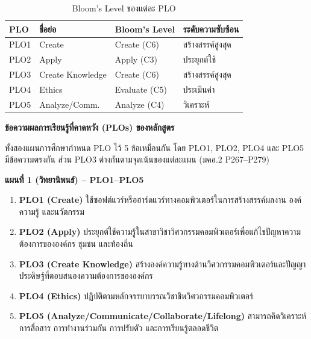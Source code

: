 \begin{table}[H]
  \centering
  \caption{Bloom's Level ของแต่ละ PLO}
  \label{tbl:bloom_plo}
  \begin{tabularx}{\linewidth}{|>{\raggedright\arraybackslash}X|>{\raggedright\arraybackslash}X|>{\raggedright\arraybackslash}X|>{\raggedright\arraybackslash}X|}
    \hline
    \textbf{PLO} & \textbf{ชื่อย่อ} & \textbf{Bloom's Level} & \textbf{ระดับความซับซ้อน} \\
    \hline
    PLO1 & Create           & Create (C6)   & สร้างสรรค์สูงสุด \\
    PLO2 & Apply            & Apply (C3)    & ประยุกต์ใช้ \\
    PLO3 & Create Knowledge & Create (C6)   & สร้างสรรค์สูงสุด \\
    PLO4 & Ethics           & Evaluate (C5) & ประเมินค่า \\
    PLO5 & Analyze/Comm.    & Analyze (C4)  & วิเคราะห์ \\
    \hline
  \end{tabularx}
\end{table}

\noindent\textbf{ข้อความผลการเรียนรู้ที่คาดหวัง (PLOs) ของหลักสูตร}

ทั้งสองแผนการศึกษากำหนด PLO ไว้ 5 ข้อเหมือนกัน โดย PLO1, PLO2, PLO4 และ PLO5 มีข้อความตรงกัน ส่วน PLO3 ต่างกันตามจุดเน้นของแต่ละแผน (มคอ.2 P267--P279)

\textbf{แผนที่ 1 (วิทยานิพนธ์) -- PLO1--PLO5}
\begin{enumerate}
  \item \textbf{PLO1 (Create)} ใช้ซอฟต์แวร์หรือฮาร์ดแวร์ทางคอมพิวเตอร์ในการสร้างสรรค์ผลงาน องค์ความรู้ และนวัตกรรม
  \item \textbf{PLO2 (Apply)} ประยุกต์ใช้ความรู้ในสาขาวิชาวิศวกรรมคอมพิวเตอร์เพื่อแก้ไขปัญหาความต้องการขององค์กร ชุมชน และท้องถิ่น
  \item \textbf{PLO3 (Create Knowledge)} สร้างองค์ความรู้ทางด้านวิศวกรรมคอมพิวเตอร์และปัญญาประดิษฐ์ที่ตอบสนองความต้องการขององค์กร
  \item \textbf{PLO4 (Ethics)} ปฏิบัติตามหลักจรรยาบรรณวิชาชีพวิศวกรรมคอมพิวเตอร์
  \item \textbf{PLO5 (Analyze/Communicate/Collaborate/Lifelong)} สามารถคิดวิเคราะห์ การสื่อสาร การทำงานร่วมกัน การปรับตัว และการเรียนรู้ตลอดชีวิต
\end{enumerate}

